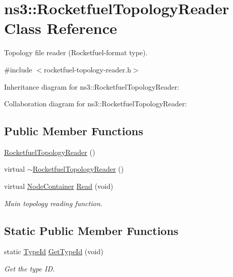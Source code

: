 \hypertarget{classns3_1_1RocketfuelTopologyReader}{}\section{ns3\+:\+:Rocketfuel\+Topology\+Reader Class Reference}
\label{classns3_1_1RocketfuelTopologyReader}


Topology file reader (Rocketfuel-\/format type).  




{\ttfamily \#include $<$rocketfuel-\/topology-\/reader.\+h$>$}



Inheritance diagram for ns3\+:\+:Rocketfuel\+Topology\+Reader\+:


Collaboration diagram for ns3\+:\+:Rocketfuel\+Topology\+Reader\+:
\subsection*{Public Member Functions}
\begin{DoxyCompactItemize}
\item 
\hyperlink{classns3_1_1RocketfuelTopologyReader_a49a682008784c4afdcc9d96496591b1b}{Rocketfuel\+Topology\+Reader} ()
\item 
virtual \hyperlink{classns3_1_1RocketfuelTopologyReader_a9941837c14eb7e967a5598e62b090228}{$\sim$\+Rocketfuel\+Topology\+Reader} ()
\item 
virtual \hyperlink{classns3_1_1NodeContainer}{Node\+Container} \hyperlink{classns3_1_1RocketfuelTopologyReader_aecde048f1ebfdce6e886cba1a798f0b1}{Read} (void)
\begin{DoxyCompactList}\small\item\em Main topology reading function. \end{DoxyCompactList}\end{DoxyCompactItemize}
\subsection*{Static Public Member Functions}
\begin{DoxyCompactItemize}
\item 
static \hyperlink{classns3_1_1TypeId}{Type\+Id} \hyperlink{classns3_1_1RocketfuelTopologyReader_a0c07c7c92d28fcbe02236ec464cb0df9}{Get\+Type\+Id} (void)
\begin{DoxyCompactList}\small\item\em Get the type ID. \end{DoxyCompactList}\end{DoxyCompactItemize}
